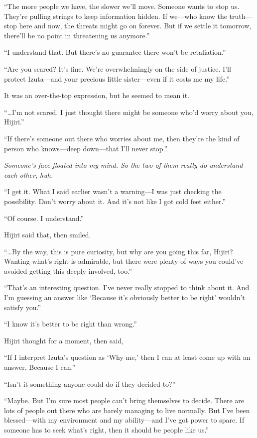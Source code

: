 \documentclass[
    a4paper,
    12pt,
    twoside,
    openany,
    UTF8,
    fontset=windows
]{ctexbook}
\begin{document}
``The more people we have, the slower we'll move. Someone wants to stop us. They're pulling strings to keep information hidden. If we---who know the truth---stop here and now, the threats might go on forever. But if we settle it tomorrow, there'll be no point in threatening us anymore.''

``I understand that. But there's no guarantee there won't be retaliation.''

``Are you scared? It's fine. We're overwhelmingly on the side of justice. I'll protect Izuta---and your precious little sister---even if it costs me my life.''

It was an over-the-top expression, but he seemed to mean it.

``\dots I'm not scared. I just thought there might be someone who'd worry about you, Hijiri.''

``If there's someone out there who worries about me, then they're the kind of person who knows---deep down---that I'll never stop.''

\textit{Someone's face floated into my mind. So the two of them really do understand each other, huh.}

``I get it. What I said earlier wasn't a warning---I was just checking the possibility. Don't worry about it. And it's not like I got cold feet either.''

``Of course. I understand.''

Hijiri said that, then smiled.

``\dots By the way, this is pure curiosity, but why are you going this far, Hijiri? Wanting what's right is admirable, but there were plenty of ways you could've avoided getting this deeply involved, too.''

``That's an interesting question. I've never really stopped to think about it. And I'm guessing an answer like `Because it's obviously better to be right' wouldn't satisfy you.''

``I know it's better to be right than wrong.''

Hijiri thought for a moment, then said,

``If I interpret Izuta's question as `Why me,' then I can at least come up with an answer. Because I can.''

``Isn't it something anyone could do if they decided to?''

``Maybe. But I'm sure most people can't bring themselves to decide. There are lots of people out there who are barely managing to live normally. But I've been blessed---with my environment and my ability---and I've got power to spare. If someone has to seek what's right, then it should be people like us.''
\end{document}
